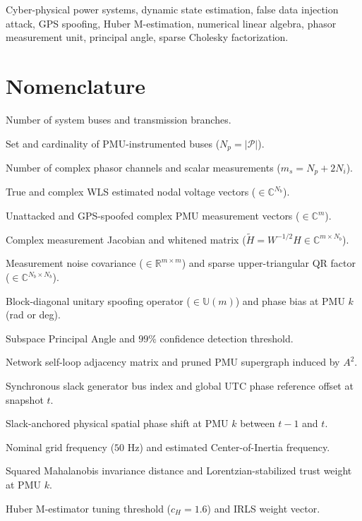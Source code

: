 \documentclass[journal,twoside]{IEEEtran}
\begin{document}
\begin{IEEEkeywords}
Cyber-physical power systems, dynamic state estimation, false data injection attack, GPS spoofing, Huber M-estimation, numerical linear algebra, phasor measurement unit, principal angle, sparse Cholesky factorization.
\end{IEEEkeywords}

\section*{Nomenclature}
\begin{IEEEdescription}
\item[$N_b, N_l$] Number of system buses and transmission branches.
\item[$\mathcal{P}, N_p$] Set and cardinality of PMU-instrumented buses ($N_p = \vert{}\mathcal{P}\vert{}$).
\item[$m, m_s$] Number of complex phasor channels and scalar measurements ($m_s = N_p + 2N_i$).
\item[$v, \hat{v}^{\mathrm{LSE}}$] True and complex WLS estimated nodal voltage vectors ($\in \mathbb{C}^{N_b}$).
\item[$z^{\mathrm{act}}, z^{\mathrm{spf}}$] Unattacked and GPS-spoofed complex PMU measurement vectors ($\in \mathbb{C}^m$).
\item[$H, \tilde{H}$] Complex measurement Jacobian and whitened matrix ($\tilde{H} = W^{-1/2}H \in \mathbb{C}^{m \times N_b}$).
\item[$W, R$] Measurement noise covariance ($\in \mathbb{R}^{m \times m}$) and sparse upper-triangular QR factor ($\in \mathbb{C}^{N_b \times N_b}$).
\item[$\Gamma, \psi_k$] Block-diagonal unitary spoofing operator ($\in \mathbb{U}(m)$) and phase bias at PMU $k$ (rad or deg).
\item[$\theta_{\mathrm{PA}}, \rho_{\mathrm{PA}}$] Subspace Principal Angle and $99\%$ confidence detection threshold.
\item[$A, G_{\mathrm{red}}$] Network self-loop adjacency matrix and pruned PMU supergraph induced by $A^2$.
\item[$s_{\mathrm{ref}}, \Delta_t$] Synchronous slack generator bus index and global UTC phase reference offset at snapshot $t$.
\item[$\Delta\theta_{k,t}^{\mathrm{phys,rel}}$] Slack-anchored physical spatial phase shift at PMU $k$ between $t-1$ and $t$.
\item[$f_0, \hat{f}_{\mathrm{COI}}$] Nominal grid frequency ($50\text{~Hz}$) and estimated Center-of-Inertia frequency.
\item[$d_{M,k}^2, w_{k,t}^{\mathrm{trust}}$] Squared Mahalanobis invariance distance and Lorentzian-stabilized trust weight at PMU $k$.
\item[$c_H, w_{\mathrm{IRLS}}$] Huber M-estimator tuning threshold ($c_H = 1.6$) and IRLS weight vector.
\end{IEEEdescription}
\end{document}
